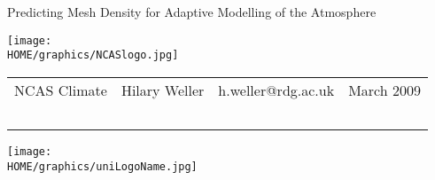\begin{center}

{\huge \color{blue}
    Predicting Mesh Density for Adaptive Modelling of the Atmosphere
}

\texttt{[image: \\HOME/graphics/NCASlogo.jpg]}
\hspace{0.01\linewidth}
\begin{tabular}{cccc}
\large NCAS Climate
&
\Large \color{purple} Hilary Weller
&
\large\color{black} h.weller@rdg.ac.uk
&
\large March 2009
\\ \ \\
\end{tabular}
\texttt{[image: \\HOME/graphics/uniLogoName.jpg]}
\end{center}
\vspace{-12pt}